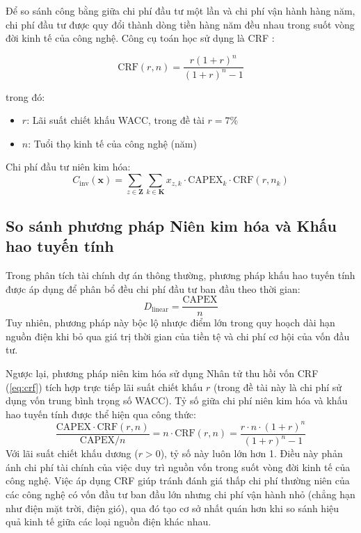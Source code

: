 Để so sánh công bằng giữa chi phí đầu tư một lần và chi phí vận hành hàng năm, chi phí đầu tư được quy đổi thành dòng tiền hàng năm đều nhau trong suốt vòng đời kinh tế của công nghệ. Công cụ toán học sử dụng là CRF \cite{brealey2020corporate}:

\begin{equation}
    \text{CRF}(r, n) = \frac{r(1+r)^n}{(1+r)^n - 1}
    \label{eq:crf}
\end{equation}

\noindent trong đó:
\begin{itemize}
    \item $r$: Lãi suất chiết khấu WACC, trong đề tài $r = 7\%$
    \item $n$: Tuổi thọ kinh tế của công nghệ (năm)
\end{itemize}

Chi phí đầu tư niên kim hóa:
\begin{equation}
    C_{\text{inv}}(\mathbf{x}) = \sum_{z \in \mathbf{Z}} \sum_{k \in \mathbf{K}} x_{z,k} \cdot \text{CAPEX}_k \cdot \text{CRF}(r, n_k)
    \label{eq:annualized_capex}
\end{equation}


\subsection{So sánh phương pháp Niên kim hóa và Khấu hao tuyến tính}

Trong phân tích tài chính dự án thông thường, phương pháp khấu hao tuyến tính được áp dụng để phân bổ đều chi phí đầu tư ban đầu theo thời gian:
\begin{equation}
    D_{\text{linear}} = \frac{\text{CAPEX}}{n}
\end{equation}
Tuy nhiên, phương pháp này bộc lộ nhược điểm lớn trong quy hoạch dài hạn nguồn điện khi bỏ qua giá trị thời gian của tiền tệ và chi phí cơ hội của vốn đầu tư.

Ngược lại, phương pháp niên kim hóa sử dụng Nhân tử thu hồi vốn CRF (\ref{eq:crf}) tích hợp trực tiếp lãi suất chiết khấu $r$ (trong đề tài này là chi phí sử dụng vốn trung bình trọng số WACC). Tỷ số giữa chi phí niên kim hóa và khấu hao tuyến tính được thể hiện qua công thức:
\begin{equation}
    \frac{\text{CAPEX} \cdot \text{CRF}(r, n)}{\text{CAPEX} / n} = n \cdot \text{CRF}(r, n) = \frac{r \cdot n \cdot (1+r)^n}{(1+r)^n - 1}
    \label{eq:crf_vs_linear}
\end{equation}
Với lãi suất chiết khấu dương ($r > 0$), tỷ số này luôn lớn hơn 1. Điều này phản ánh chi phí tài chính của việc duy trì nguồn vốn trong suốt vòng đời kinh tế của công nghệ. Việc áp dụng CRF giúp tránh đánh giá thấp chi phí thường niên của các công nghệ có vốn đầu tư ban đầu lớn nhưng chi phí vận hành nhỏ (chẳng hạn như điện mặt trời, điện gió), qua đó tạo cơ sở nhất quán hơn khi so sánh hiệu quả kinh tế giữa các loại nguồn điện khác nhau.

